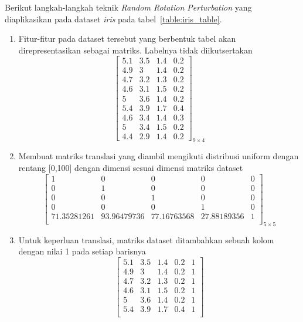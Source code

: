\documentclass[a4paper,twoside]{article}
\begin{document}
\begin{enumerate}
		Berikut langkah-langkah teknik \textit{Random Rotation Perturbation} yang diaplikasikan pada dataset \textit{iris} pada tabel~\ref{table:iris_table}.
		\begin{enumerate}
			\item Fitur-fitur pada dataset tersebut yang berbentuk tabel akan direpresentasikan sebagai matriks. Labelnya tidak diikutsertakan
			\[
				\begin{bmatrix}
				5.1		&		3.5		&		1.4		&		0.2	\\
				4.9		&		3		&		1.4		&		0.2	\\
				4.7		&		3.2		&		1.3		&		0.2	\\
				4.6		&		3.1		&		1.5		&		0.2	\\
				5		&		3.6		&		1.4		&		0.2	\\
				5.4		&		3.9		&		1.7		&		0.4	\\
				4.6		&		3.4		&		1.4		&		0.3	\\
				5		&		3.4		&		1.5		&		0.2	\\
				4.4		&		2.9		&		1.4		&		0.2 
				\end{bmatrix}_{9\times 4}
			\]
			\item Membuat matriks translasi yang diambil mengikuti distribusi uniform dengan rentang [0,100] dengan dimensi sesuai dimensi matriks dataset
			\[
				\begin{bmatrix}
					1				&		0				&		0				&		0			&		0 \\
					0				&		1				&		0				&		0			&		0 \\
					0				&		0				&		1				&		0			&		0 \\
					0				&		0				&		0				&		1 			&		0 \\
					71.35281261		&		93.96479736		&		77.16763568		&		27.88189356 &		1 \\
				\end{bmatrix}_{5\times 5}
			\]
			\item Untuk keperluan translasi, matriks dataset ditambahkan sebuah kolom dengan nilai 1 pada setiap barisnya
			\[
				\begin{bmatrix}
					5.1		&		3.5		&		1.4		&		0.2		&		1 \\
					4.9		&		3		&		1.4		&		0.2		&		1 \\
					4.7		&		3.2		&		1.3		&		0.2		&		1 \\
					4.6		&		3.1		&		1.5		&		0.2		&		1 \\
					5		&		3.6		&		1.4		&		0.2		&		1 \\
					5.4		&		3.9		&		1.7		&		0.4		&		1 \\

\end{bmatrix}\]
\end{enumerate}
\end{enumerate}
\end{document}
